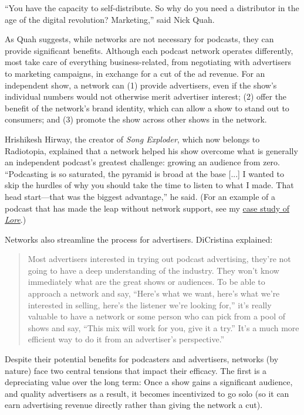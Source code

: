 \documentclass[notoc, symmetric, nobib, nols]{towcenter-guideto-book}
\begin{document}
``You have the capacity to self-distribute. So why do you need a distributor in the age of the digital revolution? Marketing,'' said Nick Quah.\autocite{quah} 

As Quah suggests, while networks are not necessary for podcasts, they can provide significant benefits. Although each podcast network operates differently, most take care of everything business-related, from negotiating with advertisers to marketing campaigns, in exchange for a cut of the ad revenue. For an independent show, a network can (1) provide advertisers, even if the show's individual numbers would not otherwise merit advertiser interest; (2) offer the benefit of the network's brand identity, which can allow a show to stand out to consumers; and (3) promote the show across other shows in the network. 

Hrishikesh Hirway, the creator of \textit{Song Exploder}, which now belongs to Radiotopia, explained that a network helped his show overcome what is generally an independent podcast's greatest challenge: growing an audience from zero. ``Podcasting is so saturated, the pyramid is broad at the base [...] I wanted to skip the hurdles of why you should take the time to listen to what I made. That head start---that was the biggest advantage,'' he said.\autocite{hirway} (For an example of a podcast that has made the leap without network support, see my \href{http://towcenter.org/case-study-lore/}{case study of \textit{Lore}}.\autocite{vqlore})

Networks also streamline the process for advertisers. DiCristina explained:

\begin{quote}
Most advertisers interested in trying out podcast advertising, they're not going to have a deep understanding of the industry. They won't know immediately what are the great shows or audiences. To be able to approach a network and say, ``Here's what we want, here's what we're interested in selling, here's the listener we're looking for,'' it's really valuable to have a network or some person who can pick from a pool of shows and say, ``This mix will work for you, give it a try.'' It's a much more efficient way to do it from an advertiser's perspective.''\autocite{mailchimp}
\end{quote}

Despite their potential benefits for podcasters and advertisers, networks (by nature) face two central tensions that impact their efficacy. The first is a depreciating value over the long term: Once a show gains a significant audience, and quality advertisers as a result, it becomes incentivized to go solo (so it can earn advertising revenue directly rather than giving the network a cut). 
\end{document}
